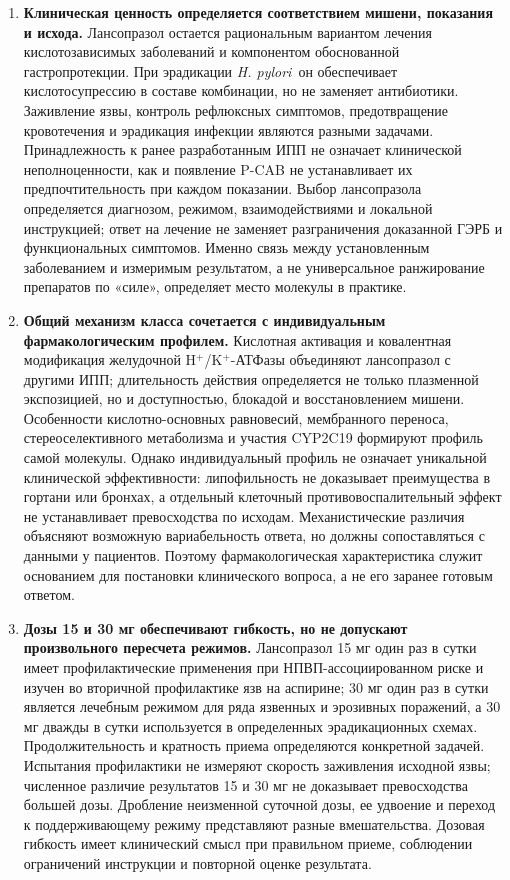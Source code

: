 \documentclass[11pt,a4paper,notitlepage]{report}
\newcommand{\Hp}{\textit{H. pylori}}
\newcommand{\src}[1]{\unskip\space\cite{#1}}
\begin{document}
\begin{enumerate}[label=\textbf{\arabic*.},leftmargin=*,itemsep=0.7\baselineskip]
\item \textbf{Клиническая ценность определяется соответствием мишени, показания и исхода.} Лансопразол остается рациональным вариантом лечения кислотозависимых заболеваний и компонентом обоснованной гастропротекции. При эрадикации \Hp\ он обеспечивает кислотосупрессию в составе комбинации, но не заменяет антибиотики. Заживление язвы, контроль рефлюксных симптомов, предотвращение кровотечения и эрадикация инфекции являются разными задачами. Принадлежность к ранее разработанным ИПП не означает клинической неполноценности, как и появление P-CAB не устанавливает их предпочтительность при каждом показании. Выбор лансопразола определяется диагнозом, режимом, взаимодействиями и локальной инструкцией; ответ на лечение не заменяет разграничения доказанной ГЭРБ и функциональных симптомов. Именно связь между установленным заболеванием и измеримым результатом, а не универсальное ранжирование препаратов по «силе», определяет место молекулы в практике.\src{uslabel,agagerd,nice,acghp,maastricht,seoul,lyon}

\item \textbf{Общий механизм класса сочетается с индивидуальным фармакологическим профилем.} Кислотная активация и ковалентная модификация желудочной H$^+$/K$^+$-АТФазы объединяют лансопразол с другими ИПП; длительность действия определяется не только плазменной экспозицией, но и доступностью, блокадой и восстановлением мишени. Особенности кислотно-основных равновесий, мембранного переноса, стереоселективного метаболизма и участия CYP2C19 формируют профиль самой молекулы. Однако индивидуальный профиль не означает уникальной клинической эффективности: липофильность не доказывает преимущества в гортани или бронхах, а отдельный клеточный противовоспалительный эффект не устанавливает превосходства по исходам. Механистические различия объясняют возможную вариабельность ответа, но должны сопоставляться с данными у пациентов. Поэтому фармакологическая характеристика служит основанием для постановки клинического вопроса, а не его заранее готовым ответом.\src{molchem,molcys,molrestore,molstereokin,cpic,toppits,asthma}

\item \textbf{Дозы 15 и 30 мг обеспечивают гибкость, но не допускают произвольного пересчета режимов.} Лансопразол 15 мг один раз в сутки имеет профилактические применения при НПВП-ассоциированном риске и изучен во вторичной профилактике язв на аспирине; 30 мг один раз в сутки является лечебным режимом для ряда язвенных и эрозивных поражений, а 30 мг дважды в сутки используется в определенных эрадикационных схемах. Продолжительность и кратность приема определяются конкретной задачей. Испытания профилактики не измеряют скорость заживления исходной язвы; численное различие результатов 15 и 30 мг не доказывает превосходства большей дозы. Дробление неизменной суточной дозы, ее удвоение и переход к поддерживающему режиму представляют разные вмешательства. Дозовая гибкость имеет клинический смысл при правильном приеме, соблюдении ограничений инструкции и повторной оценке результата.\src{uslabel,hpra,aspirin15,misotrial,nsaidagrawal2000,acghp}


\end{enumerate}
\end{document}
